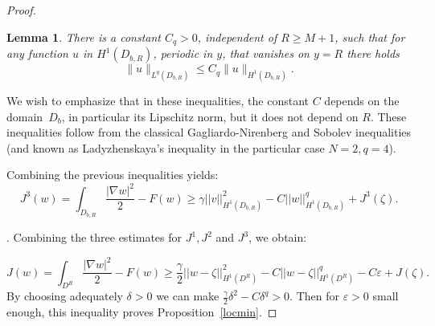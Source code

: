 \documentclass[a4paper,12pt,fullpage]{article}
\numberwithin{equation}{section}
\newtheorem{Lemma}{Lemma}[section]
\def\ep{\varepsilon}
\begin{document}
\begin{proof}
\begin{Lemma}
There is a constant $C_q>0$, independent of $R\geq M+1$, such that for any function $u$ in $H^1(D_{b, R})$, periodic in $y$, that vanishes on $y=R$ there holds
\[
\|u\|_{L^q(D_{b, R})}\leq C_q\|u\|_{H^1(D_{b, R})}.
\]
\end{Lemma}

We wish to emphasize that in these inequalities, the constant $C$ depends on the domain~$D_b$, in particular its Lipschitz norm, but it does not depend on $R$. These inequalities follow from the classical Gagliardo-Nirenberg and Sobolev inequalities (and   known as Ladyzhenskaya's inequality in the particular case $N=2, q=4$).  

Combining the previous inequalities yields:
\begin{equation}\label{J3}
J^3(w)= \int_{D_{b, R}} \frac{ |\nabla w |^2}{2} - F(w)\geq \gamma ||v||_{H^1(D_{b, R})}^2 - C ||w||_{H^1(D_{b, R})}^q +J^3(\zeta).
\end{equation}

\vskip 0.2cm
. Combining the three estimates for $J^1, J^2$ and $J^3$, we obtain:

\begin{equation}\label{Jmin}
J(w)= \int_{D^R} \frac{ |\nabla w |^2}{2} - F(w)\geq \frac{\gamma}{2} ||w-\zeta||_{H^1(D^R)}^2  - C ||w-\zeta||_{H^1(D^R)}^q  -C \ep + J(\zeta).
\end{equation}
By choosing adequately $\delta>0$ we can make $\frac{\gamma}{2}\delta^2 - C \delta^q >0$. Then for $\ep>0$ small enough, this inequality proves Proposition~\ref{locmin}.
\end{proof}
\end{document}
